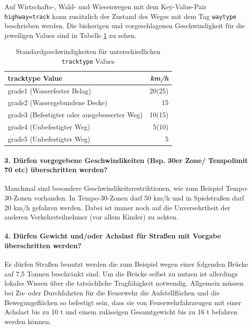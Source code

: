\documentclass[12pt,a4paper]{article}
\begin{document}
Auf Wirtschafts-, Wald- und Wiesenwegen mit dem Key-Value-Pair  \lstinline!highway=track! kann zusätzlich der Zustand des Weges mit dem Tag \lstinline!waytype! beschrieben werden. Die bisherigen und vorgeschlagenen Geschwindigkeit für die jeweiligen Values sind in Tabelle \ref{tab:speedinfotrack} zu sehen.

\begin{table}[h]
\centering
\caption{Standardgeschwindigkeiten für unterschiedlichen \lstinline!tracktype! Values}
\label{tab:speedinfotrack}
\begin{tabular}{|l|r|}
\hline
tracktype Value & \textit{km/h} \\
\hline
grade1 (Wasserfester Belag) & 20(25)     \\
grade2 (Wassergebundene Decke) & 15    \\
grade3 (Befestigter oder ausgebesserter Weg) & 10(15)  \\
grade4 (Unbefestigter Weg) & 5(10)     \\
grade5 (Unbefestigter Weg) & 5     \\
\hline
\end{tabular}
\end{table}

\paragraph*{3. Dürfen vorgegebene Geschwindikeiten (Bsp. 30er Zone/ Tempolimit 70 etc) überschritten werden?}
\label{frage3}
Manchmal sind besondere Geschwindikeitsrestriktionen, wie zum Beispiel Tempo-30-Zonen vorhanden.  In Tempo-30-Zonen darf 50 km/h und in Spielstraßen darf 20 km/h gefahren werden. Dabei ist immer noch auf die Unversehrtheit der anderen Verkehrsteilnehmer (vor allem Kinder) zu achten.

\paragraph*{4. Dürfen Gewicht und/oder Achslast für Straßen mit Vorgabe überschritten werden?}
\label{frage4}

Es dürfen Straßen benutzt werden die zum Beispiel wegen einer folgenden Brücke auf 7,5 Tonnen beschränkt sind. Um die Brücke selbst zu nutzen ist allerdings lokales Wissen über die tatsächliche Tragfähigkeit notwendig. 
Allgemein müssen bei Zu- oder Durchfahrten für die Feuerwehr die Aufstellflächen und die Bewegungsflächen so befestigt sein, dass sie von Feuerwehrfahrzeugen mit einer Achslast bis zu 10 t und einem zulässigen Gesamtgewicht bis zu 16 t befahren werden können.
\end{document}
